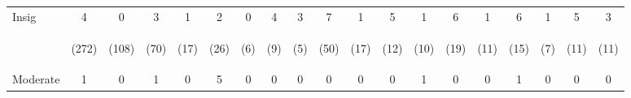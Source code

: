 \begin{tabular}{lcccccccccccccccccc}
\hline \noalign{\smallskip}Insig & 4 & 0 & 3 & 1 & 2 & 0 & 4 & 3 & 7 & 1 & 5 & 1 & 6 & 1 & 6 & 1 & 5 & 3\\
 & \begin{footnotesize}(272)\end{footnotesize} & \begin{footnotesize}(108)\end{footnotesize} & \begin{footnotesize}(70)\end{footnotesize} & \begin{footnotesize}(17)\end{footnotesize} & \begin{footnotesize}(26)\end{footnotesize} & \begin{footnotesize}(6)\end{footnotesize} & \begin{footnotesize}(9)\end{footnotesize} & \begin{footnotesize}(5)\end{footnotesize} & \begin{footnotesize}(50)\end{footnotesize} & \begin{footnotesize}(17)\end{footnotesize} & \begin{footnotesize}(12)\end{footnotesize} & \begin{footnotesize}(10)\end{footnotesize} & \begin{footnotesize}(19)\end{footnotesize} & \begin{footnotesize}(11)\end{footnotesize} & \begin{footnotesize}(15)\end{footnotesize} & \begin{footnotesize}(7)\end{footnotesize} & \begin{footnotesize}(11)\end{footnotesize} & \begin{footnotesize}(11)\end{footnotesize}\\
\noalign{\smallskip}Moderate & 1 & 0 & 1 & 0 & 5 & 0 & 0 & 0 & 0 & 0 & 0 & 1 & 0 & 0 & 1 & 0 & 0 & 0\\

\end{tabular}
